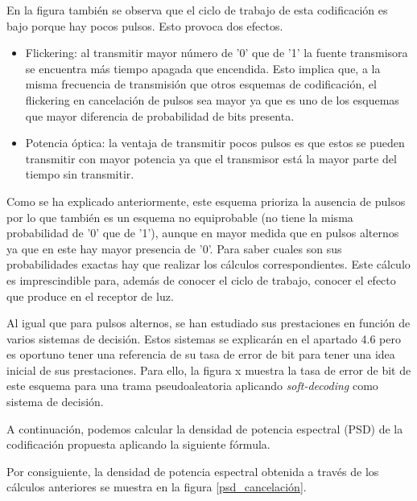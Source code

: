 En la figura también se observa que el ciclo de trabajo de esta codificación es 
bajo porque hay pocos pulsos. Esto provoca dos efectos.
\begin{itemize}
    \item Flickering: al transmitir mayor número de '0' que de '1' la fuente transmisora
        se encuentra más tiempo apagada que encendida. Esto implica que, a la misma 
        frecuencia de transmisión que otros esquemas de codificación, el flickering en 
        cancelación de pulsos sea mayor ya que es uno de los esquemas que mayor 
        diferencia de probabilidad de bits presenta.
    \item Potencia óptica: la ventaja de transmitir pocos pulsos es que estos se pueden 
        transmitir con mayor potencia ya que el transmisor está la mayor parte del tiempo
        sin transmitir. 
\end{itemize}

Como se ha explicado anteriormente, este esquema prioriza la ausencia de pulsos por
lo que también es un esquema no equiprobable (no tiene la misma probabilidad de '0'
que de '1'), aunque en mayor medida que en pulsos
alternos ya que en este hay mayor presencia de '0'. Para saber cuales son sus 
probabilidades exactas hay que realizar los cálculos correspondientes. Este cálculo es 
imprescindible para, además de conocer el ciclo de trabajo, conocer el efecto que 
produce en el receptor de luz.

Al igual que para pulsos alternos, se han estudiado sus prestaciones en función de varios 
sistemas de decisión. Estos sistemas se explicarán en el apartado 4.6 pero es oportuno 
tener una referencia de su tasa de error de bit para tener una idea inicial de sus 
prestaciones. Para ello, la figura x muestra la tasa de error de bit de este esquema
para una trama pseudoaleatoria aplicando \textit{soft-decoding} como sistema de decisión. 

A continuación, podemos calcular la densidad de potencia espectral (PSD) de la 
codificación propuesta aplicando la siguiente fórmula.

Por consiguiente, la densidad de potencia espectral obtenida a través de los cálculos
anteriores se muestra en la figura \ref{psd_cancelación}.

